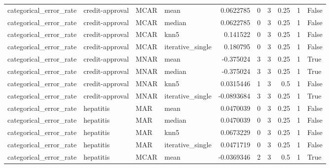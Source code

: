 \begin{table}[ht]
\begin{tabular}{llllrrrrrl}
 categorical\_error\_rate & credit-approval & MCAR        & mean             &      0.0622785   &                   0 &       3 &      0.25 &        1 & False              \\
 categorical\_error\_rate & credit-approval & MCAR        & median           &      0.0622785   &                   0 &       3 &      0.25 &        1 & False              \\
 categorical\_error\_rate & credit-approval & MCAR        & knn5             &      0.141522    &                   0 &       3 &      0.25 &        1 & False              \\
 categorical\_error\_rate & credit-approval & MCAR        & iterative\_single &      0.180795    &                   0 &       3 &      0.25 &        1 & False              \\
 categorical\_error\_rate & credit-approval & MNAR        & mean             &     -0.375024    &                   3 &       3 &      0.25 &        1 & True               \\
 categorical\_error\_rate & credit-approval & MNAR        & median           &     -0.375024    &                   3 &       3 &      0.25 &        1 & True               \\
 categorical\_error\_rate & credit-approval & MNAR        & knn5             &      0.0315446   &                   1 &       3 &      0.5  &        1 & False              \\
 categorical\_error\_rate & credit-approval & MNAR        & iterative\_single &     -0.0893684   &                   3 &       3 &      0.25 &        1 & True               \\
 categorical\_error\_rate & hepatitis       & MAR         & mean             &      0.0470039   &                   0 &       3 &      0.25 &        1 & False              \\
 categorical\_error\_rate & hepatitis       & MAR         & median           &      0.0470039   &                   0 &       3 &      0.25 &        1 & False              \\
 categorical\_error\_rate & hepatitis       & MAR         & knn5             &      0.0673229   &                   0 &       3 &      0.25 &        1 & False              \\
 categorical\_error\_rate & hepatitis       & MAR         & iterative\_single &      0.0471719   &                   0 &       3 &      0.25 &        1 & False              \\
 categorical\_error\_rate & hepatitis       & MCAR        & mean             &     -0.0369346   &                   2 &       3 &      0.5  &        1 & True               \\

\end{tabular}
\end{table}
